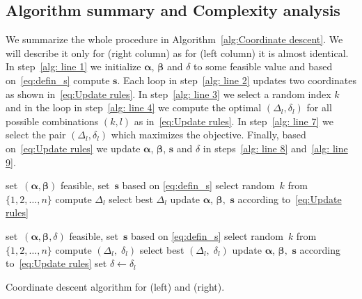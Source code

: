 \subsection{Algorithm summary and Complexity analysis}

We summarize the whole procedure in Algorithm~\ref{alg:Coordinate descent}. We will describe it only for \PatMat (right column) as for \TopPushK (left column) it is almost identical. In step~\ref{alg: line 1} we initialize $\bm{\alpha}$, $\bm{\beta}$ and $\delta$ to some feasible value and based on~\eqref{eq:defin_s} compute $\bm s$. Each \repeatloop loop in step~\ref{alg: line 2} updates two coordinates as shown in~\eqref{eq:Update rules}. In step~\ref{alg: line 3} we select a random index $k$ and in the \forloop loop in step~\ref{alg: line 4} we compute the optimal $(\Delta_l,\delta_l)$ for all possible combinations $(k,l)$ as in~\eqref{eq:Update rules}. In step~\ref{alg: line 7} we select the pair $(\Delta_l,\delta_l)$ which maximizes the objective. Finally, based on~\eqref{eq:Update rules} we update $\bm{\alpha}$, $\bm{\beta}$, $\bm s$ and $\delta$ in steps~\ref{alg: line 8} and~\ref{alg: line 9}.

\begin{algorithm*}[!ht]
  \begin{minipage}{0.48\textwidth}
    \centering
    \begin{algorithmic}[1]
      \State set~$(\bm{\alpha}, \bm{\beta})$ feasible, set~$\bm{s}$ based on \eqref{eq:defin_s} \label{alg: line 1}
      \Repeat \label{alg: line 2}
        \State select random~$k$ from $\{1, 2, \ldots, n\}$ \label{alg: line 3}
         \label{alg: line 4}
            \State compute $\Delta_{l}$  \label{alg: line 5}
        \EndFor
        \State select best $\Delta_{l}$ \label{alg: line 7}
        \State update $\bm{\alpha}$, $\bm{\beta},$ $\bm{s}$ according to~\eqref{eq:Update rules} \label{alg: line 8}
        \State \label{alg: line 9}
    \end{algorithmic}
  \end{minipage}
  \hfill
  \begin{minipage}{0.51\textwidth}
    \centering
    \begin{algorithmic}[1]
      \State set~$(\bm{\alpha}, \bm{\beta}, \delta)$ feasible, set~$\bm{s}$ based on \eqref{eq:defin_s}
      \Repeat
        \State select random~$k$ from $\{1, 2, \ldots, n\}$ 
            \State compute $(\Delta_{l}, \; \delta_{l})$
        \EndFor
        \State select best $(\Delta_{l}, \; \delta_{l})$
        \State update $\bm{\alpha}$, $\bm{\beta},$ $\bm{s}$ according to~\eqref{eq:Update rules}
        \State set $\delta \leftarrow \delta_{l}$
    \end{algorithmic}
  \end{minipage}
  \caption{Coordinate descent algorithm for \TopPushK (left) and \PatMat (right).}
  \label{alg:Coordinate descent}
\end{algorithm*}

